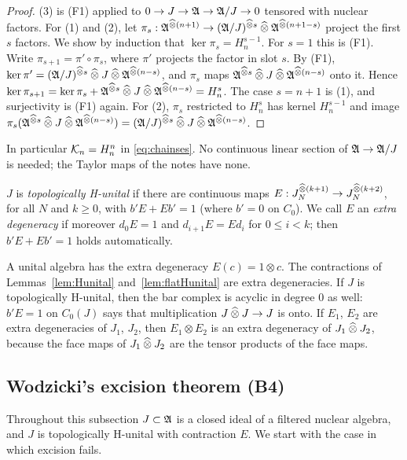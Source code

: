 \begin{proof}
(3) is (F1) applied to \(0\to J\to\mathfrak A\to\mathfrak A/J\to0\) tensored with nuclear
factors. For (1) and (2), let \(\pi_s:\mathfrak A^{\mathbin{\widehat\otimes}(n+1)}\to(\mathfrak A/J)^{\mathbin{\widehat\otimes} s}
\mathbin{\widehat\otimes}\mathfrak A^{\mathbin{\widehat\otimes}(n+1-s)}\) project the first \(s\) factors. We show by
induction that \(\ker\pi_s=H^{s-1}_n\). For \(s=1\) this is (F1). Write
\(\pi_{s+1}=\pi'\circ\pi_s\), where \(\pi'\) projects the factor in slot
\(s\). By (F1), \(\ker\pi'=(\mathfrak A/J)^{\mathbin{\widehat\otimes} s}\mathbin{\widehat\otimes} J\mathbin{\widehat\otimes}\mathfrak A^{\mathbin{\widehat\otimes}(n-s)}\),
and \(\pi_s\) maps \(\mathfrak A^{\mathbin{\widehat\otimes} s}\mathbin{\widehat\otimes} J\mathbin{\widehat\otimes}\mathfrak A^{\mathbin{\widehat\otimes}(n-s)}\) onto it.
Hence \(\ker\pi_{s+1}=\ker\pi_s+\mathfrak A^{\mathbin{\widehat\otimes} s}\mathbin{\widehat\otimes} J\mathbin{\widehat\otimes}\mathfrak A^{\mathbin{\widehat\otimes}(n-s)}=
H^s_n\). The case \(s=n+1\) is (1), and surjectivity is (F1) again. For
(2), \(\pi_s\) restricted to \(H^s_n\) has kernel \(H^{s-1}_n\) and image
\(\pi_s(\mathfrak A^{\mathbin{\widehat\otimes} s}\mathbin{\widehat\otimes} J\mathbin{\widehat\otimes}\mathfrak A^{\mathbin{\widehat\otimes}(n-s)})=(\mathfrak A/J)^{\mathbin{\widehat\otimes} s}\mathbin{\widehat\otimes} J\mathbin{\widehat\otimes}
\mathfrak A^{\mathbin{\widehat\otimes}(n-s)}\).
\end{proof}

In particular \(\mathcal K_n=H^n_n\) in \eqref{eq:chainses}. No continuous linear
section of \(\mathfrak A\to\mathfrak A/J\) is needed; the Taylor maps of the notes have
none.

\begin{definition}\label{ha:def:Hunital}
\(J\) is \emph{topologically H-unital} if there are continuous maps
\(E:J_N^{\mathbin{\widehat\otimes}(k+1)}\to J_N^{\mathbin{\widehat\otimes}(k+2)}\), for all \(N\) and \(k\ge0\), with
\(b'E+Eb'=1\) (where \(b'=0\) on \(C_0\)). We call \(E\) an \emph{extra
degeneracy} if moreover \(d_0E=1\) and \(d_{i+1}E=Ed_i\) for \(0\le i<k\);
then \(b'E+Eb'=1\) holds automatically.
\end{definition}

A unital algebra has the extra degeneracy \(E(c)=1\otimes c\). The
contractions of Lemmas~\ref{lem:Hunital} and~\ref{lem:flatHunital} are
extra degeneracies. If \(J\) is topologically H-unital, then the bar
complex is acyclic in degree \(0\) as well: \(b'E=1\) on \(C_0(J)\) says
that multiplication \(J\mathbin{\widehat\otimes} J\to J\) is onto. If \(E_1\), \(E_2\) are extra
degeneracies of \(J_1\), \(J_2\), then \(E_1\otimes E_2\) is an extra
degeneracy of \(J_1\mathbin{\widehat\otimes} J_2\), because the face maps of \(J_1\mathbin{\widehat\otimes} J_2\)
are the tensor products of the face maps.

\subsection{Wodzicki's excision theorem (B4)}\label{ha:subsec:excision}

Throughout this subsection \(J\subset\mathfrak A\) is a closed ideal of a filtered
nuclear algebra, and \(J\) is topologically H-unital with contraction
\(E\). We start with the case in which excision fails.

